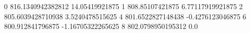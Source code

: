 0 816.1340942382812 14.05419921875
1 808.85107421875 6.77117919921875
2 805.6039428710938 3.5240478515625
4 801.6522827148438 -0.4276123046875
6 800.912841796875 -1.16705322265625
8 802.0798950195312 0.0
